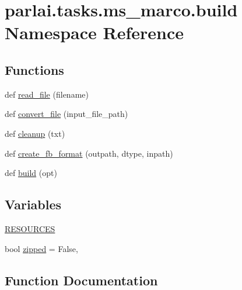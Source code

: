 \hypertarget{namespaceparlai_1_1tasks_1_1ms__marco_1_1build}{}\section{parlai.\+tasks.\+ms\+\_\+marco.\+build Namespace Reference}
\label{namespaceparlai_1_1tasks_1_1ms__marco_1_1build}
\subsection*{Functions}
\begin{DoxyCompactItemize}
\item 
def \hyperlink{namespaceparlai_1_1tasks_1_1ms__marco_1_1build_a8e7fee7824a3a7aa1facadf9979f3f4a}{read\+\_\+file} (filename)
\item 
def \hyperlink{namespaceparlai_1_1tasks_1_1ms__marco_1_1build_ac19db5d0ad4ba8559f6aca64f2fe192b}{convert\+\_\+file} (input\+\_\+file\+\_\+path)
\item 
def \hyperlink{namespaceparlai_1_1tasks_1_1ms__marco_1_1build_a6c94ade2f99fa70bf4103a22a1fbdc42}{cleanup} (txt)
\item 
def \hyperlink{namespaceparlai_1_1tasks_1_1ms__marco_1_1build_ac3cdd4cc2ccd3e9551ddd0349b94d537}{create\+\_\+fb\+\_\+format} (outpath, dtype, inpath)
\item 
def \hyperlink{namespaceparlai_1_1tasks_1_1ms__marco_1_1build_a3516057a3812247cdb1b1c9e8f6cb84d}{build} (opt)
\end{DoxyCompactItemize}
\subsection*{Variables}
\begin{DoxyCompactItemize}
\item 
\hyperlink{namespaceparlai_1_1tasks_1_1ms__marco_1_1build_af344d1660233d915e9e6efa8ceccb22b}{R\+E\+S\+O\+U\+R\+C\+ES}
\item 
bool \hyperlink{namespaceparlai_1_1tasks_1_1ms__marco_1_1build_adb324374455a28b4f2ba20ab53e3d18c}{zipped} = False,
\end{DoxyCompactItemize}


\subsection{Function Documentation}
\mbox{\label{namespaceparlai_1_1tasks_1_1ms__marco_1_1build_a3516057a3812247cdb1b1c9e8f6cb84d}} 
